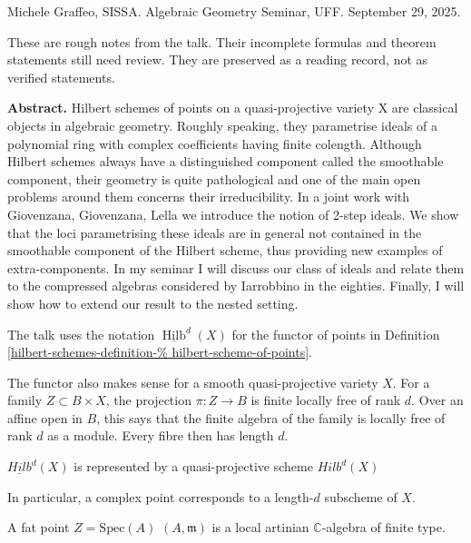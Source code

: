 \noindent
Michele Graffeo, SISSA.
Algebraic Geometry Seminar, UFF.
September 29, 2025.

\medskip\noindent
These are rough notes from the talk.
Their incomplete formulas and theorem
statements still need review.
They are preserved as a reading record,
not as verified statements.

\medskip\noindent
{\bf Abstract.}
Hilbert schemes of points on a
quasi-projective variety X are classical
objects
in algebraic geometry. Roughly speaking, they
parametrise ideals of a polynomial
ring with complex coefficients having finite
colength. Although Hilbert schemes
always have a distinguished component called
the smoothable component, their
geometry is quite pathological and one of the
main open problems around them
concerns their irreducibility. In a joint
work with Giovenzana, Giovenzana,
Lella we introduce the notion of 2-step
ideals. We show that the loci
parametrising these ideals are in general not
contained in the smoothable
component of the Hilbert scheme, thus
providing new examples of
extra-components.  In my seminar I will
discuss our class of ideals and relate
them to the compressed algebras considered by
Iarrobbino in the eighties.
Finally, I will show how to extend our result
to the nested setting.


\medskip\noindent

The talk uses the notation
$\underline{\operatorname{Hilb}}^d(X)$
for the functor of points in Definition
\ref{hilbert-schemes-definition-%
hilbert-scheme-of-points}.

\begin{remark}
\label{definition-hilbert-scheme}
The functor also makes sense for a smooth
quasi-projective variety $X$. For a family
$Z\subset B\times X$, the projection
$\pi:Z\to B$ is finite locally free of
rank $d$. Over an affine open in $B$, this
says that the finite algebra of the family
is locally free of rank $d$ as a module.
Every fibre then has length $d$.
\end{remark}

\begin{theorem}[Grothendieck]
\label{theorem-grothendieck}
$\underline{Hilb}^d(X)$ is represented by a
quasi-projective
scheme $Hilb^d(X)$
\end{theorem}

In particular, a complex point corresponds
to a length-$d$ subscheme of $X$.

A fat point $Z= \text{Spec}(A)$ $(A,
\mathfrak{m})$ is a
local artinian $\mathbb{C}$-algebra of finite
type.

